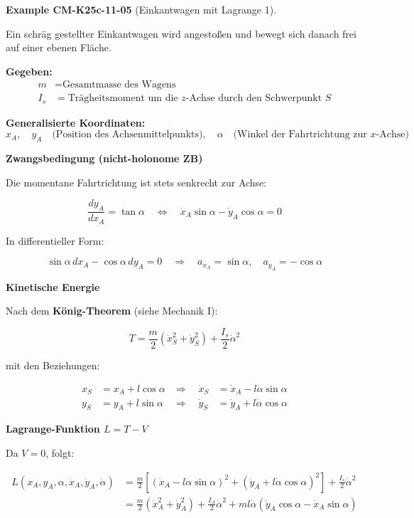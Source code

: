 \documentclass[10pt, letterpaper]{article}
\newcommand{\CustomHeading}[3]{%
  \par\medskip\noindent%
  \textbf{#1 #2} \textnormal{(#3)}.\enskip%
}
\newenvironment{EXA}[2]{\CustomHeading{Example}{#1}{#2}}{}
\begin{document}
\begin{EXA}{CM-K25c-11-05}{Einkantwagen mit Lagrange 1}
Ein schräg gestellter Einkantwagen wird angestoßen und bewegt sich danach frei auf einer ebenen Fläche.

\vspace{1em}
\textbf{Gegeben:}
\begin{align*}
m &= \text{Gesamtmasse des Wagens} \\
I_s &= \text{Trägheitsmoment um die } z\text{-Achse durch den Schwerpunkt } S
\end{align*}

\textbf{Generalisierte Koordinaten:}
\[
x_A, \quad y_A \quad \text{(Position des Achsenmittelpunkts)}, 
\quad \alpha \quad \text{(Winkel der Fahrtrichtung zur } x\text{-Achse)}
\]

\textbf{Zwangsbedingung (nicht-holonome ZB)}

Die momentane Fahrtrichtung ist stets senkrecht zur Achse:

\[
\frac{dy_A}{dx_A} = \tan\alpha 
\quad \Leftrightarrow \quad
\dot{x}_A \sin\alpha - \dot{y}_A \cos\alpha = 0
\]

\noindent
In differentieller Form:

\[
\sin\alpha \, dx_A - \cos\alpha \, dy_A = 0
\quad \Rightarrow \quad
a_{x_A} = \sin\alpha, \quad a_{y_A} = -\cos\alpha
\]

\textbf{Kinetische Energie}

Nach dem \textbf{König-Theorem} (siehe Mechanik I):

\[
T = \frac{m}{2} (\dot{x}_S^2 + \dot{y}_S^2) + \frac{I_s}{2} \dot{\alpha}^2
\]

mit den Beziehungen:

\begin{align*}
x_S &= x_A + l \cos\alpha 
&\Rightarrow \quad \dot{x}_S &= \dot{x}_A - l \dot{\alpha} \sin\alpha \\
y_S &= y_A + l \sin\alpha 
&\Rightarrow \quad \dot{y}_S &= \dot{y}_A + l \dot{\alpha} \cos\alpha
\end{align*}

\textbf{Lagrange-Funktion \( L = T - V \)}

Da \( V = 0 \), folgt:

\begin{align*}
L(x_A, y_A, \alpha, \dot{x}_A, \dot{y}_A, \dot{\alpha}) 
&= \frac{m}{2} \left[ (\dot{x}_A - l \dot{\alpha} \sin\alpha)^2 + (\dot{y}_A + l \dot{\alpha} \cos\alpha)^2 \right] + \frac{I_s}{2} \dot{\alpha}^2 \\[1ex]
&= \frac{m}{2} (\dot{x}_A^2 + \dot{y}_A^2) 
+ \frac{I_A}{2} \dot{\alpha}^2 
+ m l \dot{\alpha} ( \dot{y}_A \cos\alpha - \dot{x}_A \sin\alpha )
\end{align*}


\end{EXA}
\end{document}
